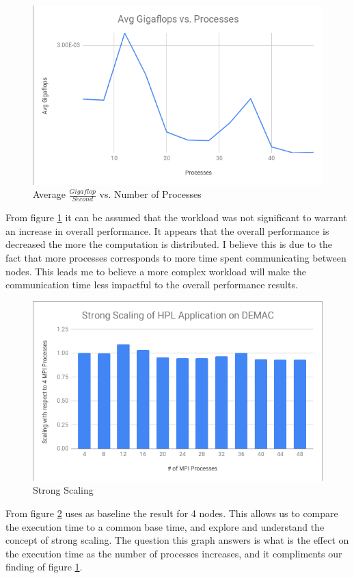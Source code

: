 \documentclass[letterpaper,12pt]{article}
\begin{document}
\begin{figure}[h]
  \includegraphics[width = \linewidth]{avgGig.png}
  \caption{Average $\frac{Gigaflop}{Second}$ vs. Number of Processes} \label{fig:avgGig}
  \end{figure}
From figure \ref{fig:avgGig} it can be assumed that the workload was not significant to warrant an increase in overall performance. It appears that the overall performance is decreased the more the computation is distributed. I believe this is due to the fact that more processes corresponds to more time spent communicating between nodes. This leads me to believe a more complex workload will make the communication time less impactful to the overall performance results.

\begin{figure}[h]
  \includegraphics[width = \linewidth]{strongScaling.png}
  \caption{Strong Scaling}\label{fig:strongScale}
\end{figure}

From figure \ref{fig:strongScale} uses as baseline the result for 4 nodes. This allows us to compare the execution time to a common base time, and explore and understand the concept of strong scaling. The question this graph answers is what is the effect on the execution time as the number of processes increases, and it compliments our finding of figure \ref{fig:avgGig}.
\end{document}
